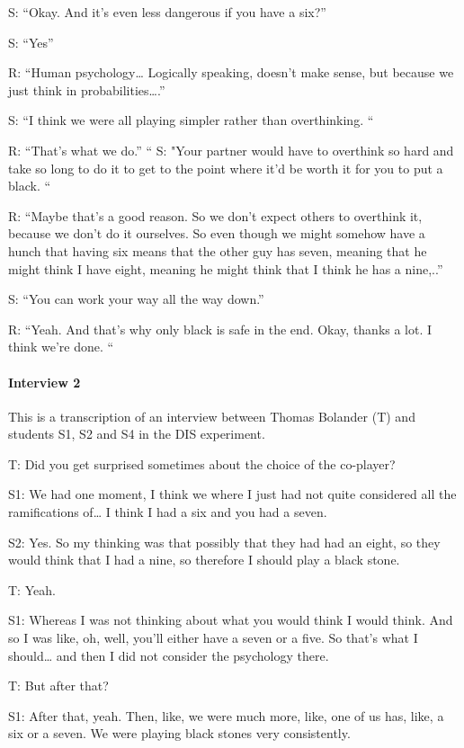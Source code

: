 S: “Okay. And it's even less dangerous if you have a six?”

S: “Yes”

R: “Human psychology… Logically speaking, doesn't make sense, but because we just think in probabilities….”

S: “I think we were all playing simpler rather than overthinking. “

R: “That's what we do.” 
“
S: "Your partner would have to overthink so hard and take so long to do it to get to the point where it'd be worth it for you to put a black. “

R: “Maybe that's a good reason. So we don't expect others to overthink it, because we don't do it ourselves. So even though we might somehow have a hunch that having six means that the other guy has seven, meaning that he might think I have eight, meaning he might think that I think he has a nine,..”

S: “You can work your way all the way down.”

R: “Yeah. And that's why only black is safe in the end. Okay, thanks a lot. I think we're done. “




\bigskip
\paragraph{Interview 2}
This is a transcription of an interview between Thomas Bolander (T) and students S1, S2 and S4 in the DIS experiment.

\medskip
T: Did you get surprised sometimes about the choice of the co-player? 

S1: We had one moment, I think we where I just had not quite considered all the ramifications of… I think I had a six and you had a seven. 

S2: Yes. So my thinking was that possibly that they had had an eight, so they would think that I had a nine, so therefore I should play a black stone.

T: Yeah. 

S1: Whereas I was not thinking about what you would think I would think. And so I was like, oh, well, you'll either have a seven or a five. So that's what I should… and then I did not consider the psychology there.

T: But after that?

S1: After that, yeah. Then, like, we were much more, like, one of us has, like, a six or a seven. We were playing black stones very consistently. 

